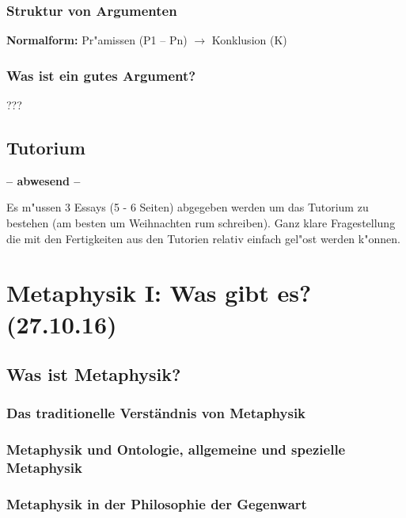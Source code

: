 \documentclass[emulatestandardclasses]{scrartcl}
\begin{document}
\subsubsection{Struktur von Argumenten}
\textbf{Normalform:}  Pr"amissen (P1 -- Pn) $\rightarrow$ Konklusion (K)


\subsubsection{Was ist ein gutes Argument?}

???

\subsection{Tutorium}

\textbf{-- abwesend --}
\newline

Es m"ussen 3 Essays (5 - 6 Seiten) abgegeben werden um das Tutorium zu bestehen (am besten um Weihnachten rum schreiben). Ganz klare Fragestellung die mit den Fertigkeiten aus den Tutorien relativ einfach gel"ost werden k"onnen.


\newpage

\section{Metaphysik I: Was gibt es?\\(27.10.16)}

\subsection{Was ist Metaphysik?}


\subsubsection{Das traditionelle Verständnis von Metaphysik}


\subsubsection{Metaphysik und Ontologie, allgemeine und spezielle Metaphysik}


\subsubsection{Metaphysik in der Philosophie der Gegenwart}
\end{document}
